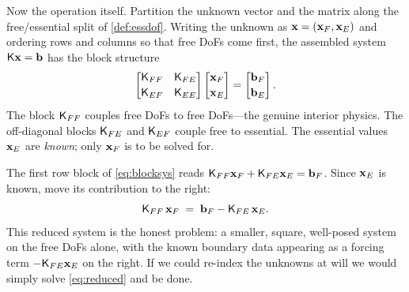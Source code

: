 Now the operation itself. Partition the unknown vector and the matrix along the
free/essential split of \cref{def:essdof}. Writing the unknown as
$\mathbf{x}=(\mathbf{x}_F,\mathbf{x}_E)$ and ordering rows and columns so that free DoFs come first,
the assembled system $\mathsf{K}\mathbf{x}=\mathbf{b}$ has the block structure
\begin{equation}
  \begin{bmatrix} \mathsf{K}_{FF} & \mathsf{K}_{FE} \\[2pt]
                  \mathsf{K}_{EF} & \mathsf{K}_{EE} \end{bmatrix}
  \begin{bmatrix} \mathbf{x}_F \\[2pt] \mathbf{x}_E \end{bmatrix}
  =
  \begin{bmatrix} \mathbf{b}_F \\[2pt] \mathbf{b}_E \end{bmatrix}.
  \label{eq:blocksys}
\end{equation}
The block $\mathsf{K}_{FF}$ couples free DoFs to free DoFs---the genuine interior
physics. The off-diagonal blocks $\mathsf{K}_{FE}$ and $\mathsf{K}_{EF}$ couple free to
essential. The essential values $\mathbf{x}_E$ are \emph{known}; only $\mathbf{x}_F$ is to be
solved for.

The first row block of \cref{eq:blocksys} reads
$\mathsf{K}_{FF}\mathbf{x}_F + \mathsf{K}_{FE}\mathbf{x}_E = \mathbf{b}_F$. Since $\mathbf{x}_E$ is known, move its
contribution to the right:
\begin{equation}
  \mathsf{K}_{FF}\,\mathbf{x}_F \;=\; \mathbf{b}_F - \mathsf{K}_{FE}\,\mathbf{x}_E.
  \label{eq:reduced}
\end{equation}
This reduced system is the honest problem: a smaller, square, well-posed system
on the free DoFs alone, with the known boundary data appearing as a forcing term
$-\mathsf{K}_{FE}\mathbf{x}_E$ on the right. If we could re-index the unknowns at will we
would simply solve \cref{eq:reduced} and be done.

